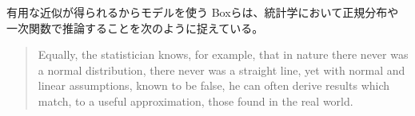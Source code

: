 \begin{SMbox}{有用な近似が得られるからモデルを使う}
 Boxらは、統計学において正規分布や一次関数で推論することを次のように捉えている\cite{box1976science}。
 \begin{quote}
  Equally, the statistician knows, for example, that in nature there never was a normal distribution, there never was a straight line, yet with normal and linear assumptions, known to be false, he can often derive results which match, to a useful approximation, those found in the real world. 
 \end{quote}
\end{SMbox}



